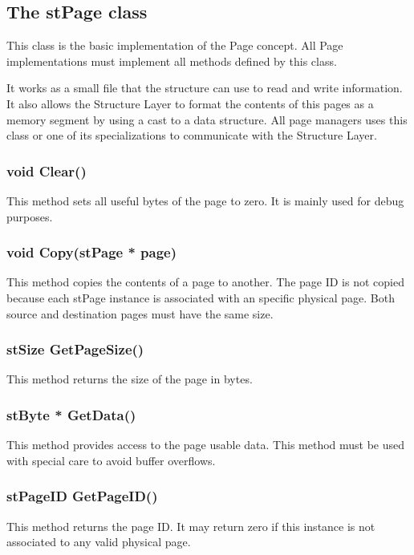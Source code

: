 \subsection{The stPage class}

This class is the basic implementation of the Page concept. All Page implementations must implement all methods defined by this class.

It works as a small file that the structure can use to read and write information. It also allows the Structure Layer to format the contents of this pages as a memory segment by using a cast to a data structure. All page managers uses this class or one of its specializations to communicate with the Structure Layer.

\subsubsection{void Clear()}
This method sets all useful bytes of the page to zero. It is mainly used for debug purposes.

\subsubsection{void Copy(stPage * page)}
This method copies the contents of a page to another. The page ID is not copied because each stPage instance is associated with an specific physical page. Both source and destination pages must have the same size.

\subsubsection{stSize GetPageSize()}
This method returns the size of the page in bytes.

\subsubsection{stByte * GetData()}
This method provides access to the page usable data. This method must be used with special care to avoid buffer overflows.

\subsubsection{stPageID GetPageID()}
This method returns the page ID. It may return zero if this instance is not associated to any valid physical page.

